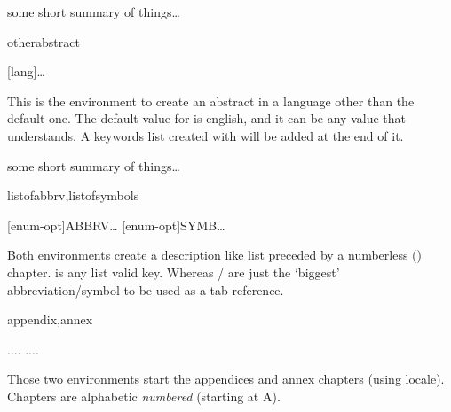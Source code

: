 \documentclass[article,nofontwarning,nogeometry,english,tocdepth=3,secdepth=3]{ufrgscca} %
\begin{document}
\begin{codestore}[st=d.abstract]
	\begin{mainabstract} some short summary of things\ldots
	\end{mainabstract}
\end{codestore}

\begin{codedescribe}[env,update=2023/11/18]{otherabstract}
	\begin{codesyntax}%
		\tsmacro{\begin{otherabstract}}[lang]\ldots\tsmacro{\end{otherabstract}}{}
	\end{codesyntax}
This is the environment to create an abstract in a language other than the default one.
The default value for  is english, and it can be any value that  understands. A keywords list created with \tsmacro{\otherkeyword}{} will be added at the end of it.
\end{codedescribe}

\begin{codestore}[st=d.oabstract]
	\otherkeyword{a keyword}
	\otherkeyword{another keyword}
	\begin{otherabstract}[english] some short summary of things\ldots
	\end{otherabstract}
\end{codestore}


\begin{codedescribe}[env]{listofabbrv,listofsymbols}
	\begin{codesyntax}%
	\tsmacro{\begin{listofabbrv}}[enum-opt]{ABBRV}\ldots\tsmacro{\end{listofabbrv}}{}
	\tsmacro{\begin{listofsymbols}}[enum-opt]{SYMB}\ldots\tsmacro{\end{listofsymbols}}{}
	\end{codesyntax}
\end{codedescribe}
Both environments create a description like list preceded by a numberless (\tsmacro{\nonum}{}) chapter.  is any  list valid key. Whereas  /  are just the `biggest' abbreviation/symbol to be used as a tab reference.

\begin{codedescribe}[env]{appendix,annex}
	\begin{codesyntax}%
		\tsmacro{\begin{appendix}}{}.... \tsmacro{\end{appendix}}{}
		\tsmacro{\begin{annex}}{}.... \tsmacro{\end{annex}}{}
	\end{codesyntax}
\end{codedescribe}
Those two environments start the appendices and annex chapters (using locale). Chapters are  alphabetic \emph{numbered} (starting at A).
\end{document}
